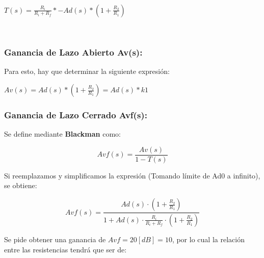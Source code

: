\begin{center}
    \\
\end{center}

$T(s) = \frac{R_i}{R_i + R_f}*-Ad(s)*(1 + \frac{R_2}{R_1})$\\

\begin{center}
    \\
\end{center}

\newpage
\subsubsection{Ganancia de Lazo Abierto Av(s):}
Para esto, hay que determinar la siguiente expresión:\\

\begin{center}
\end{center}

$Av(s) = Ad(s)*(1+ \frac{R_2}{R_1}) = Ad(s)*k1$

\begin{center}
\end{center}

\subsubsection{Ganancia de Lazo Cerrado Avf(s):}
Se define mediante \textbf{Blackman} como:

\[Avf(s) = \frac{Av(s)}{1-T(s)}\]

Si reemplazamos y simplificamos la expresión (Tomando límite de Ad0 a infinito), se obtiene:

\[Avf(s) = \frac{Ad(s)\cdot (1 + \frac{R_2}{R_1})}{1+Ad(s)\cdot \frac{R_i}{R_i + R_f}\cdot (1 + \frac{R_2}{R_1})}\]

\begin{center}
\end{center}

Se pide obtener una ganancia de $Avf = 20 [dB] = 10$, por lo cual la relación entre las resistencias tendrá que ser de:\\

